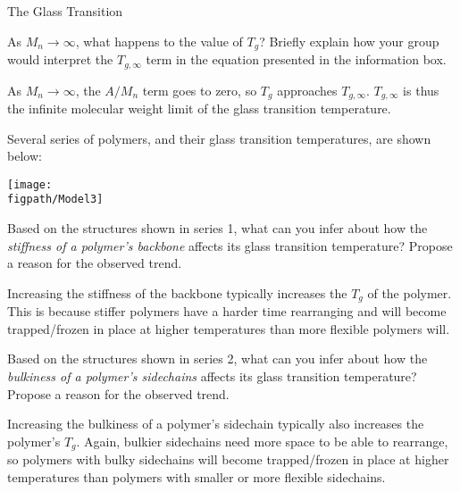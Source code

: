 \begin{activity}{The Glass Transition}
\begin{ctqs}
	\question As $M_n\to\infty$, what happens to the value of $T_g$?  Briefly explain how your group would interpret the $T_{g,\infty}$ term in the equation presented in the information box.
	
		\begin{solution}[1in]
			As $M_n\to\infty$, the $A/M_n$ term goes to zero, so $T_g$ approaches $T_{g,\infty}$.  $T_{g,\infty}$ is thus the infinite molecular weight limit of the glass transition temperature.
		\end{solution}
	
\end{ctqs}

\clearpage
\begin{model}
	\label{\labelbase:mdl:Tgdeterminants}

	Several series of polymers, and their glass transition temperatures, are shown below:
	
	\centerline{\texttt{[image: \\figpath/Model3]}}
	
\end{model}

\begin{ctqs}
	
	\question Based on the structures shown in series 1, what can you infer about how the \emph{stiffness of a polymer's backbone} affects its glass transition temperature?  Propose a reason for the observed trend.
	
		\begin{solution}[0.75in]
			Increasing the stiffness of the backbone typically increases the $T_g$ of the polymer.  This is because stiffer polymers have a harder time rearranging and will become trapped/frozen in place at higher temperatures than more flexible polymers will.
		\end{solution}
	

	\question Based on the structures shown in series 2, what can you infer about how the \emph{bulkiness of a polymer's sidechains} affects its glass transition temperature?  Propose a reason for the observed trend.
	
		\begin{solution}[0.75in]
			Increasing the bulkiness of a polymer's sidechain typically also increases the polymer's $T_g$.  Again, bulkier sidechains need more space to be able to rearrange, so polymers with bulky sidechains will become trapped/frozen in place at higher temperatures than polymers with smaller or more flexible sidechains.
		\end{solution}
	

\end{ctqs}
\end{activity}
